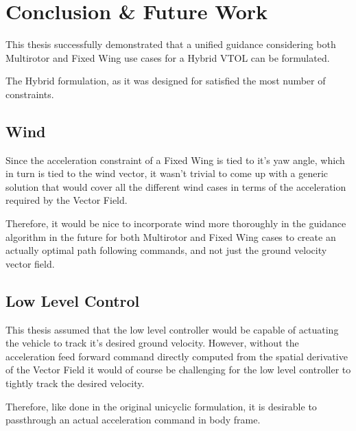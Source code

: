 \documentclass[10pt,twoside,a4paper]{report}
\begin{document}
\cleardoublepage

\chapter{Conclusion \& Future Work}

This thesis successfully demonstrated that a unified guidance considering both Multirotor and Fixed Wing use cases for a Hybrid VTOL can be formulated.

The Hybrid formulation, as it was designed for satisfied the most number of constraints.

\section{Wind}
Since the acceleration constraint of a Fixed Wing is tied to it's yaw angle, which in turn is tied to the wind vector, it wasn't trivial to come up with a generic solution that would cover all the different wind cases in terms of the acceleration required by the Vector Field.

Therefore, it would be nice to incorporate wind more thoroughly in the guidance algorithm in the future for both Multirotor and Fixed Wing cases to create an actually optimal path following commands, and not just the ground velocity vector field.

\section{Low Level Control}
This thesis assumed that the low level controller would be capable of actuating the vehicle to track it's desired ground velocity. However, without the acceleration feed forward command directly computed from the spatial derivative of the Vector Field it would of course be challenging for the low level controller to tightly track the desired velocity.

Therefore, like done in the original unicyclic formulation, it is desirable to passthrough an actual acceleration command in body frame. 

\cleardoublepage

% 
% 

% 
% 
\end{document}
